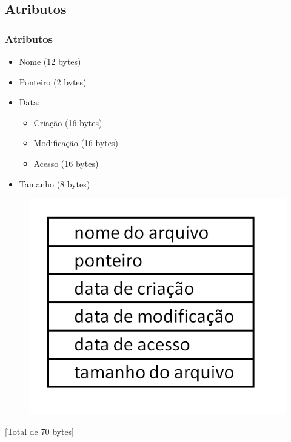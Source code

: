 \documentclass{beamer}
\begin{document}
\subsection{Atributos}
\begin{frame}
\frametitle{Atributos}
\begin{multicols}{2}

\begin{itemize}
\item Nome (12 bytes)  
\item Ponteiro (2 bytes)
\item Data: 
	\begin{itemize}
	\item Criação (16 bytes)
	\item Modificação (16 bytes)
	\item Acesso (16 bytes)
	\end{itemize}
\item Tamanho (8 bytes)
\end{itemize}

\begin{figure}
	\includegraphics[scale=0.35, right]{estruturadirpng.png}
\end{figure}
\justifying
\end{multicols}

\begin{center}
[Total de 70 bytes]
\end{center}

\end{frame}
\end{document}
